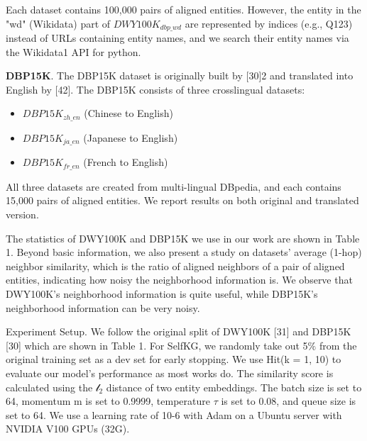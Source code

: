 \documentclass[sigconf]{acmart}
\begin{document}
{Each dataset contains 100,000 pairs of aligned entities. However, the entity in the "wd" (Wikidata) part of $DWY100K_{dbp\_wd}$ are represented by indices (e.g., Q123) instead of URLs containing entity names, and we search their entity names via the Wikidata1 API for python.

{\bfseries DBP15K}. The DBP15K dataset is originally built by [30]2 and translated into English by [42]. The DBP15K consists of three crosslingual datasets:
\begin{itemize}
\item $DBP15K_{zh\_en}$ (Chinese to English)
\item $DBP15K_{ja\_en}$ (Japanese to English) 
\item $DBP15K_{fr\_en}$ (French to English)
\end{itemize}

All three datasets are created from multi-lingual DBpedia, and each contains 15,000 pairs of aligned entities. We report results on both original and translated version.

The statistics of DWY100K and DBP15K we use in our work are shown in Table 1. Beyond basic information, we also present a study on datasets’ average (1-hop) neighbor similarity, which is the ratio of aligned neighbors of a pair of aligned entities, indicating how noisy the neighborhood information is. We observe that DWY100K’s neighborhood information is quite useful, while DBP15K’s neighborhood information can be very noisy.

Experiment Setup. We follow the original split of DWY100K [31] and DBP15K [30] which are shown in Table 1. For SelfKG, we randomly take out 5$\%$ from the original training set as a dev set for early stopping. We use Hit\@k (k = 1, 10) to evaluate our model’s performance as most works do. The similarity score is calculated using the $\mathscr{l}_{2}$ distance of two entity embeddings. The batch size is set to 64, momentum m is set to 0.9999, temperature $\tau$ is set to 0.08, and queue size is set to 64. We use a learning rate of 10-6 with Adam on a Ubuntu server with NVIDIA V100 GPUs (32G).

\begin{table}
\caption{Statistics of DWY100K and DBP15K.}
\label{tab:freq}
\linespread{2}
\renewcommand\arraystretch{1.5}
\end{table}

}
\end{document}
